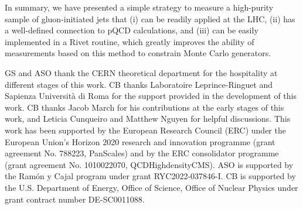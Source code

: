 \documentclass[a4paper,11pt]{article}
\begin{document}
In summary, we have presented a simple strategy to measure a high-purity sample of gluon-initiated jets that (i) can be readily applied at the LHC, (ii) has a well-defined connection to pQCD calculations, and (iii) can be easily implemented in a Rivet routine, which greatly improves the ability of measurements based on this method to constrain Monte Carlo generators.

\acknowledgments
GS and ASO thank the CERN theoretical department for the hospitality at different stages of this work. CB thanks Laboratoire Leprince-Ringuet and Sapienza Universit\`{a} di Roma for the support provided in the development of this work. CB thanks Jacob March for his contributions at the early stages of this work, and Leticia Cunqueiro and Matthew Nguyen for helpful discussions. This work has been supported by the European Research Council (ERC) under the European Union’s Horizon 2020 research and innovation programme (grant agreement No. 788223, PanScales) and by the ERC consolidator programme (grant agreement No. 1010022070, QCDHighdensityCMS). ASO is supported by the Ramón y Cajal program under grant RYC2022-037846-I. CB is supported by the U.S. Department of Energy, Office of Science, Office of Nuclear Physics under grant contract number DE-SC0011088.


\end{document}

